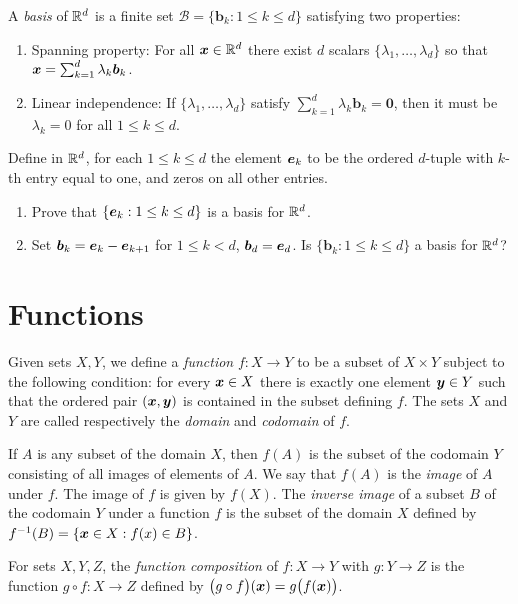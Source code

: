 A \emph{basis} of $\mathbb{R}^d$ is a finite set $\mathcal{B}=\{ \boldsymbol{b}_k : 1\leq k \leq d \}$ satisfying two properties:
\begin{enumerate}
\item Spanning property: For all $\boldsymbol{x} \in \mathbb{R}^d$ there exist $d$ scalars $\{ \lambda_1, \dotsc, \lambda_d \}$ so that $\boldsymbol{x} = \sum_{k=1}^d \lambda_k \boldsymbol{b}_k$.
\item Linear independence: If $\{ \lambda_1, \dotsc, \lambda_d\}$ satisfy $\sum_{k=1}^d \lambda_k \boldsymbol{b}_k = \boldsymbol{0}$, then it must be $\lambda_k=0$ for all $1\leq k \leq d$.
\end{enumerate}

\begin{problem}\label{problem:basisRd}
Define in $\mathbb{R}^d$, for each $1\leq k \leq d$ the element $\boldsymbol{e}_k$ to be the ordered $d$-tuple with $k$-th entry equal to one, and zeros on all other entries.
\begin{enumerate}
	\item Prove that $\{ \boldsymbol{e}_k : 1\leq k \leq d\}$ is a basis for $\mathbb{R}^d$.
	\item Set $\boldsymbol{b}_k = \boldsymbol{e}_k - \boldsymbol{e}_{k+1}$ for $1\leq k < d$, $\boldsymbol{b}_d = \boldsymbol{e}_d$.  Is $\{ \boldsymbol{b}_k : 1\leq k \leq d\}$ a basis for $\mathbb{R}^d$?
\end{enumerate}
\end{problem}

\section{Functions}

Given sets $X, Y$, we define a \emph{function} $f\colon X \to Y$ to be a subset of $X \times Y$ subject to the following condition: for every $\boldsymbol{x} \in X$ there is exactly one element $\boldsymbol{y} \in Y$ such that the ordered pair $(\boldsymbol{x}, \boldsymbol{y})$ is contained in the subset defining $f$. The sets $X$ and $Y$ are called respectively the \emph{domain} and \emph{codomain} of $f$.  

If $A$ is any subset of the domain $X$, then $f(A)$ is the subset of the codomain $Y$ consisting of all images of elements of $A$. We say that $f(A)$ is the \emph{image} of $A$ under $f$. The image of $f$ is given by $f(X)$.  The \emph{inverse image} of a subset $B$ of the codomain $Y$ under a function $f$ is the subset of the domain $X$ defined by $f^{-1}(B) = \{ \boldsymbol{x} \in X : f(x) \in B\}$.

For sets $X, Y, Z$, the \emph{function composition} of $f\colon X \to Y$ with $g\colon Y \to Z$ is the function $g\circ f\colon X \to Z$ defined by $\big( g \circ f \big)(\boldsymbol{x}) = g \big( f(\boldsymbol{x}) \big)$.

